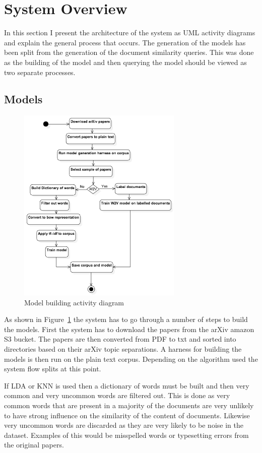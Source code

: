 \section{System Overview}
In this section I present the architecture of the system as UML activity diagrams and explain the general process that occurs.
The generation of the models has been split from the generation of the document similarity queries.
This was done as the building of the model and then querying the model should be viewed as two separate processes.

\subsection{Models}
\begin{figure}[h]
    \centering
        \includegraphics[width=0.7\textwidth]{Figures/ArchictectureBuildingUML.png}
    \caption{Model building activity diagram}
    \label{fig:buildUML}
\end{figure}
As shown in Figure~\ref{fig:buildUML} the system has to go through a number of steps to build the models.
First the system has to download the papers from the arXiv amazon S3 bucket.
The papers are then converted from PDF to txt and sorted into directories based on their arXiv topic separations.
A harness for building the models is then run on the plain text corpus.
Depending on the algorithm used the system flow splits at this point.

If LDA or KNN is used then a dictionary of words must be built and then very common and very uncommon words are filtered out.
This is done as very common words that are present in a majority of the documents are very unlikely to have strong influence on the similarity of the content of documents.
Likewise very uncommon words are discarded as they are very likely to be noise in the dataset.
Examples of this would be misspelled words or typesetting errors from the original papers.

